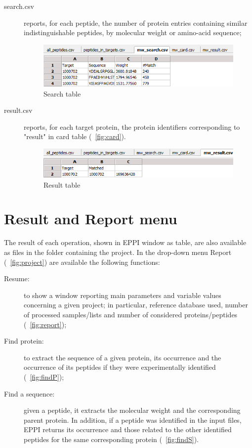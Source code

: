 \documentclass[a4paper,14pt]{extarticle}
\begin{document}
\begin{description}
\item[search.csv] reports, for each peptide, the number of protein entries containing similar indistinguishable peptides, by molecular weight or amino-acid sequence;
\begin{figure}[htbp]
\begin{center}
\includegraphics[scale=0.5]{search}
\caption{Search table}\label{fig:search}
\end{center}
\end{figure}
\item[result.csv] reports, for each target protein, the protein identifiers corresponding to "result" in card table (\figurename~\ref{fig:card}).
\begin{figure}[htbp]
\begin{center}
\includegraphics[scale=0.5]{result}
\caption{Result table}\label{fig:result}
\end{center}
\end{figure}
\end{description}

\section{Result and Report menu}

The result of each operation, shown in EPPI window as table, are also available as files in the folder  containing the project.   
In the drop-down menu Report (\figurename~\ref{fig:project}) are available the following functions:
\begin{description}
\item [Resume:] to show a window reporting main parameters and variable values concerning a given project; in particular, reference database used, number of processed samples/lists and number of considered proteins/peptides (\figurename~\ref{fig:report});
\item [Find protein:] to extract the sequence of a given protein, its occurrence and the occurrence of its peptides if they were experimentally identified (\figurename~\ref{fig:findP});
\item [Find a sequence:] given a peptide, it extracts the molecular weight and the corresponding parent protein. In addition, if a peptide was identified in the input files, EPPI returns its occurrence and those related to the other identified peptides for the same corresponding protein (\figurename~\ref{fig:findS}).
\end{description}
\end{document}

